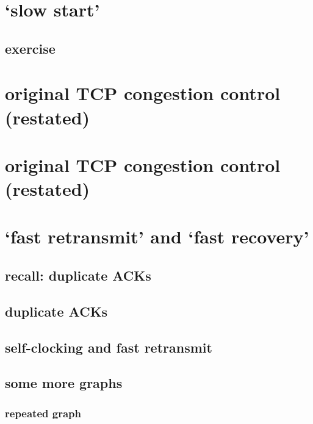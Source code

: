 
\section{`slow start'}

\subsection{exercise}


\section{original TCP congestion control (restated)}


\section{original TCP congestion control (restated)}


\section{`fast retransmit' and `fast recovery'}

\subsection{recall: duplicate ACKs}


\subsection{duplicate ACKs}


\subsection{self-clocking and fast retransmit}


\subsection{some more graphs}
\subsubsection{repeated graph}

